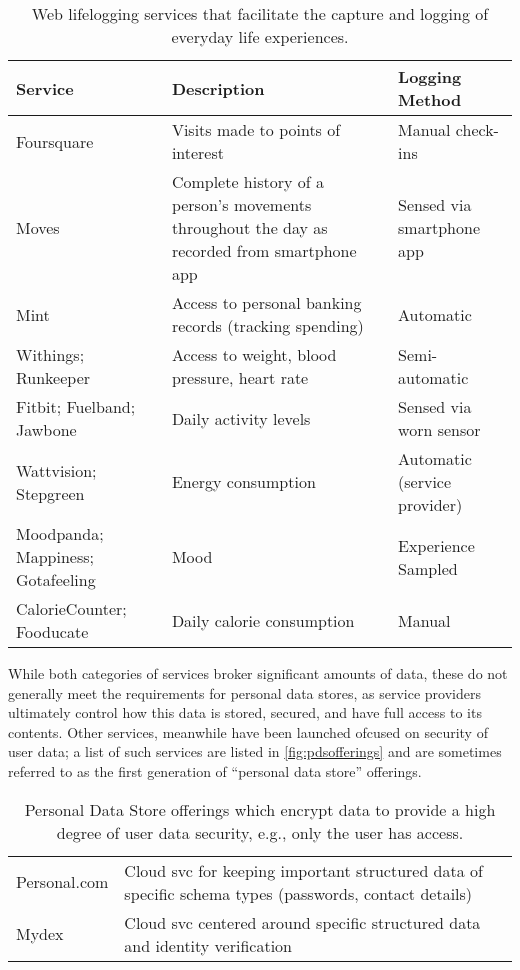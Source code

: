 \documentclass[graybox]{svmult}
\begin{document}
\begin{table}
\begin{tabular}{p{2cm} p{6.1cm} p{2.54cm}}
Service & Description & Logging Method \\
\hline
Foursquare & Visits made to points of interest & Manual check-ins \\
\hline
Moves & Complete history of a person's movements throughout the day as recorded from smartphone app  & Sensed via smartphone app \\ 
\hline
Mint & Access to personal banking records (tracking spending) & Automatic \\
\hline
Withings; Runkeeper & Access to weight, blood pressure, heart rate & Semi-automatic\\
\hline
Fitbit; Fuelband; Jawbone & Daily activity levels & Sensed via worn sensor \\ 
\hline
Wattvision; Stepgreen & Energy consumption & Automatic (service provider) \\
\hline
Moodpanda; Mappiness; Gotafeeling & Mood & Experience Sampled \\
\hline
CalorieCounter; Fooducate & Daily calorie consumption & Manual \\
\end{tabular}
\caption{Web lifelogging services that facilitate the capture and logging of everyday life experiences. }
\label{fig:aboutme}
\end{table}

While both categories of services broker significant amounts of data, these do not generally meet the requirements for personal data stores, as service providers ultimately control how this data is stored, secured, and have full access to its contents.  Other services, meanwhile have been launched ofcused on security of user data; a list of such services are listed in \ref{fig:pdsofferings} and are sometimes referred to as the first generation of ``personal data store'' offerings.

\begin{table}
\begin{tabular}{l p{8.5cm}}
Personal.com & Cloud svc for keeping important structured data of specific schema types (passwords, contact details)  \\
Mydex & Cloud svc centered around specific structured data and identity verification  \\
\end{tabular}
\caption{Personal Data Store offerings which encrypt data to provide a high degree of user data security, e.g., only the user has access.}
\label{fig:pdsofferingsp}
\end{table}
\end{document}

